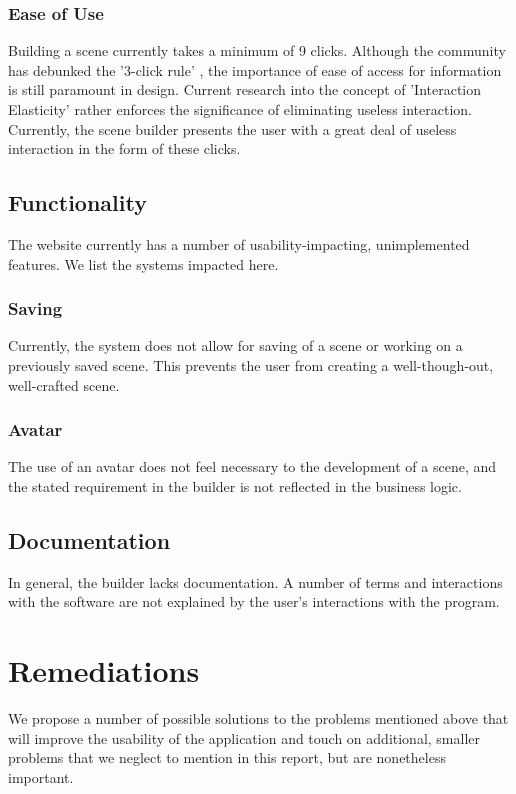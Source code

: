 \documentclass[sigconf]{acmart}
\begin{document}
\subsubsection{Ease of Use}
Building a scene currently takes a minimum of 9 clicks. Although the community has debunked the '3-click rule' \cite{ThreeclickRule2023}, the importance of ease of access for information is still paramount in design. Current research into the concept of 'Interaction Elasticity' \cite{experienceInteractionElasticity} rather enforces the significance of eliminating useless interaction. Currently, the scene builder presents the user with a great deal of useless interaction in the form of these clicks.

\subsection{Functionality}
The website currently has a number of usability-impacting, unimplemented features. We list the systems impacted here.

\subsubsection{Saving}
Currently, the system does not allow for saving of a scene or working on a previously saved scene. This prevents the user from creating a well-though-out, well-crafted scene.

\subsubsection{Avatar}
The use of an avatar does not feel necessary to the development of a scene,  and the stated requirement in the builder is not reflected in the business logic.

\subsection{Documentation}
In general, the builder lacks documentation. A number of terms and interactions with the software are not explained by the user's interactions with the program.

\section{Remediations}\label{remediations}
We propose a number of possible solutions to the problems mentioned above that will improve the usability of the application and touch on additional, smaller problems that we neglect to mention in this report, but are nonetheless important.
\end{document}
